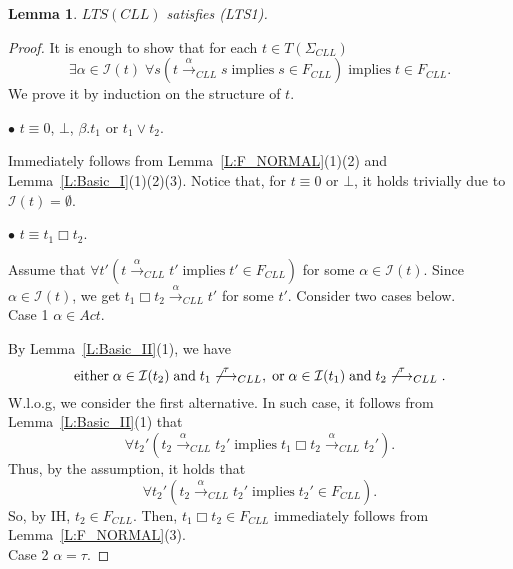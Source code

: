 \documentclass{elsarticle}
\theoremstyle{plain}
\newtheorem{lemma}[theorem]{Lemma}
\theoremstyle{definition}
\begin{document}
\begin{lemma}\label{L:LLTS_I}
   $LTS(CLL)$ satisfies (LTS1).
\end{lemma}
\begin{proof}
 It is enough to show that for each $t\in T(\Sigma_{CLL})$
    \[\exists \alpha \in {\mathcal I}(t)\;\forall s (t \stackrel{\alpha}{\longrightarrow}_{{CLL}} s \;\text{implies}\; s \in F_{{CLL}})\; \text{implies}\; t \in F_{{CLL}}. \]
    We prove it by induction on the structure of $t$.


  \noindent $\bullet$ $t \equiv 0$, $\bot$, $\beta.t_1$ or $t_1 \vee t_2$.

        Immediately follows from Lemma~\ref{L:F_NORMAL}(1)(2) and Lemma~\ref{L:Basic_I}(1)(2)(3).
        Notice that, for $t\equiv 0$ or $\bot$, it holds trivially due to ${\mathcal I}(t)= \emptyset$.

  \noindent $\bullet$ $t \equiv t_1 \Box t_2$.

        Assume that $\forall t'(t \stackrel{\alpha}{\longrightarrow}_{{CLL}} t'\;\text{implies}\; t' \in F_{{CLL}})$ for some $\alpha \in {\mathcal I}(t)$. Since $\alpha \in {\mathcal I}(t)$, we get $t_1\Box t_2 \stackrel{\alpha}{\longrightarrow}_{{CLL}}t'$ for some $t'$.
        Consider two cases below.\\

       \noindent Case 1 $\alpha \in Act$.

        By Lemma~\ref{L:Basic_II}(1), we have
        \[\text{either}\; \alpha \in {\mathcal I}(t_2)\; \text{and}\; t_1 \not\stackrel{\tau}{\longrightarrow}_{CLL}, \;\text{or}\; \alpha \in {\mathcal I}(t_1) \;\text{and}\; t_2 \not\stackrel{\tau}{\longrightarrow}_{CLL}.\]
        W.l.o.g, we consider the first alternative.
        In such case, it follows from Lemma~\ref{L:Basic_II}(1) that
        \[\forall t_2'(t_2 \stackrel{\alpha}{\longrightarrow}_{{CLL}} t_2'\;\text{implies}\; t_1 \Box t_2 \stackrel{\alpha}{\longrightarrow}_{CLL}t_2').\]
        Thus, by the assumption, it holds that
        \[\forall t_2'(t_2 \stackrel{\alpha}{\longrightarrow}_{{CLL}} t_2'\;\text{implies}\; t_2' \in F_{CLL}).\]
        So, by IH, $t_2 \in F_{CLL}$.
        Then, $t_1 \Box t_2  \in F_{{CLL}}$ immediately follows from Lemma~\ref{L:F_NORMAL}(3).\\

       \noindent Case 2 $\alpha = \tau$.


\end{proof}
\end{document}
